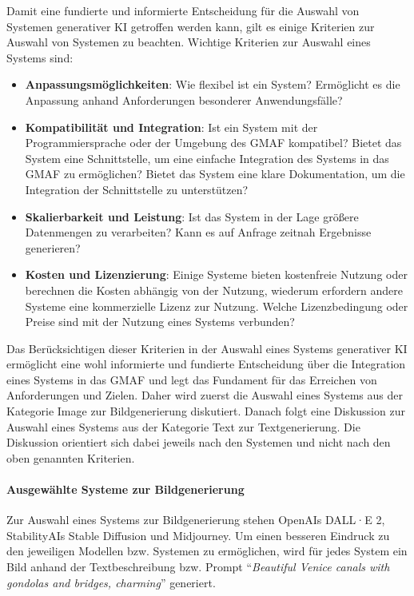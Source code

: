 Damit eine fundierte und informierte Entscheidung für die Auswahl von Systemen generativer KI getroffen werden kann, gilt es einige Kriterien zur Auswahl von Systemen zu beachten.
Wichtige Kriterien zur Auswahl eines Systems sind:
\begin{itemize}
    \item \textbf{Anpassungsmöglichkeiten}: Wie flexibel ist ein System?
    Ermöglicht es die Anpassung anhand Anforderungen besonderer Anwendungsfälle?
    \item \textbf{Kompatibilität und Integration}: Ist ein System mit der Programmiersprache oder der Umgebung des GMAF kompatibel?
    Bietet das System eine Schnittstelle, um eine einfache Integration des Systems in das GMAF zu ermöglichen?
    Bietet das System eine klare Dokumentation, um die Integration der Schnittstelle zu unterstützen?
    \item \textbf{Skalierbarkeit und Leistung}: Ist das System in der Lage größere Datenmengen zu verarbeiten?
    Kann es auf Anfrage zeitnah Ergebnisse generieren?
    \item \textbf{Kosten und Lizenzierung}: Einige Systeme bieten kostenfreie Nutzung oder berechnen die Kosten abhängig von der Nutzung, wiederum erfordern andere Systeme eine kommerzielle Lizenz zur Nutzung.
    Welche Lizenzbedingung oder Preise sind mit der Nutzung eines Systems verbunden?
\end{itemize}

Das Berücksichtigen dieser Kriterien in der Auswahl eines Systems generativer KI ermöglicht eine wohl informierte und fundierte Entscheidung über die Integration eines Systems in das GMAF und legt das Fundament für das Erreichen von Anforderungen und Zielen.
Daher wird zuerst die Auswahl eines Systems aus der Kategorie Image zur Bildgenerierung diskutiert.
Danach folgt eine Diskussion zur Auswahl eines Systems aus der Kategorie Text zur Textgenerierung.
Die Diskussion orientiert sich dabei jeweils nach den Systemen und nicht nach den oben genannten Kriterien.

\paragraph{Ausgewählte Systeme zur Bildgenerierung}
Zur Auswahl eines Systems zur Bildgenerierung stehen OpenAIs DALL·E 2, StabilityAIs Stable Diffusion und Midjourney.
Um einen besseren Eindruck zu den jeweiligen Modellen bzw. Systemen zu ermöglichen, wird für jedes System ein Bild anhand der Textbeschreibung bzw. Prompt \enquote{\textit{Beautiful Venice canals with gondolas and bridges, charming}} generiert.

